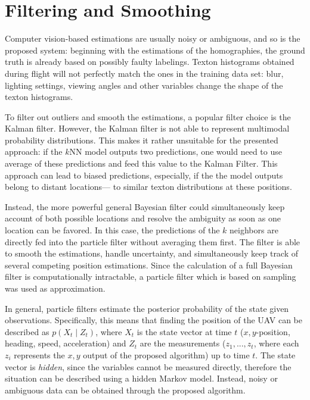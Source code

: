 \section{Filtering and Smoothing}
\label{sec:filtering}


Computer vision-based estimations are usually noisy or ambiguous, and
so is the proposed system: beginning with the estimations of the
homographies, the ground truth is already based on possibly faulty
labelings. Texton histograms obtained during flight will not perfectly
match the ones in the training data set: blur, lighting settings,
viewing angles and other variables change the shape of the texton
histograms.

To filter out outliers and smooth the estimations, a popular filter
choice is the Kalman filter. However, the Kalman filter is not able to
represent multimodal probability distributions. This makes it rather
unsuitable for the presented approach: if the $k$NN model outputs two
predictions, one would need to use average of these predictions and
feed this value to the Kalman Filter. This approach can lead to biased
predictions, especially, if the the model outputs belong to distant
locations--- to similar texton distributions at these positions.

Instead, the more powerful general Bayesian filter could simultaneously keep
account of both possible locations and resolve the ambiguity as soon
as one location can be favored. In this case, the predictions of the
$k$ neighbors are directly fed into the particle filter without
averaging them first. The filter is able to smooth the estimations,
handle uncertainty, and simultaneously keep track of several competing
position estimations. Since the calculation of a full Bayesian filter is computationally intractable, a particle filter which is based on sampling was used as approximation. 

In general, particle filters estimate the posterior probability of the
state given observations. Specifically, this means that finding the
position of the UAV can be described as $p(X_t \mid Z_t)$, where $X_t$
is the state vector at time $t$ ($x,y$-position, heading, speed,
acceleration) and $Z_t$ are the measurements ($z_1, ..., z_t$, where
each $z_i$ represents the $x,y$ output of the proposed algorithm) up
to time $t$. The state vector is \emph{hidden}, since the variables
cannot be measured directly, therefore the situation can be described
using a hidden Markov model. Instead, noisy or ambiguous data can be
obtained through the proposed algorithm.

